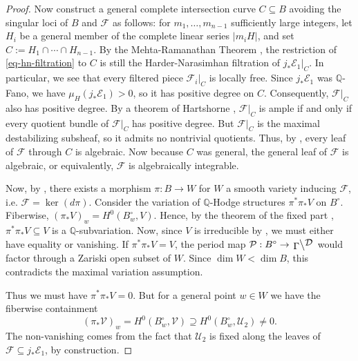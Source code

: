 \documentclass[12pt]{amsart}
\newcommand{\Q}{\mathbb{Q}}
\newcommand{\leftQ}[2]{\left.\raisebox{-.2em}{$#2$}\middle\backslash\raisebox{.2em}{$#1$}\right.}
\theoremstyle{definition}
\theoremstyle{remark}
\numberwithin{equation}{section}
\begin{document}
\begin{proof}
Now construct a general complete intersection curve \(C \subseteq B\) avoiding 
the singular loci of \(B\) and \(\mathcal{F}\) as follows: for 
\(m_1, \dots, m_{n-1}\) sufficiently large integers, let \(H_i\) be a general
member of the complete linear series \(|m_i H|\), and set 
\(C := H_1 \cap \cdots \cap H_{n-1}\). By the Mehta-Ramanathan Theorem 
\cite{mehta-ram84}, the restriction of \eqref{eq-hn-filtration} to \(C\)
is still the Harder-Narasimhan filtration of \(j_* \mathcal{E}_1|_C\).
In particular, we see that every filtered piece \(\mathcal{F}_i|_C\) is locally free.
Since \(j_* \mathcal{E}_1\) was \(\Q\)-Fano, we have \(\mu_H(j_* \mathcal{E}_1) > 0\),
so it has positive degree on \(C\). Consequently, \(\mathcal{F}|_C\) also has positive
degree. By a theorem of Hartshorne \cite[Theorem 2.4]{hart71}, \(\mathcal{F}|_C\)
is ample if and only if every quotient bundle of \(\mathcal{F}|_C\) has positive
degree. But \(\mathcal{F}|_C\) is the maximal destabilizing subsheaf, so it admits 
no nontrivial quotients. Thus, by , 
every leaf of \(\mathcal{F}\) through \(C\) is algebraic. Now because \(C\) was general,
the general leaf of \(\mathcal{F}\) is algebraic,
or equivalently, \(\mathcal{F}\) is algebraically integrable.

Now, by \cite[Theorem 2.1.9]{chen23}, there exists a morphism \(\pi: B \to W\)
for \(W\) a smooth variety inducing
\(\mathcal{F}\), i.e. \(\mathcal{F} = \ker(d\pi)\). Consider the 
variation of \(\Q\)-Hodge structures \(\pi^*\pi_* V\) on \(B^\circ\). Fiberwise, 
\((\pi_* V)_w = H^0(B_w^\circ, V)\). Hence, by the theorem of the fixed part
\cite{schmid73}, \(\pi^*\pi_* V \subseteq V\) is a \(\Q\)-subvariation. Now, since \(V\) is 
irreducible by , we must either have equality or vanishing.
If \(\pi^*\pi_* V = V\), the period map 
\(\mathcal{P}: B^\circ \to \leftQ{\mathcal{D}}{\Gamma}\) would factor through 
a Zariski open subset of \(W\). Since \(\dim W < \dim B\), this contradicts the 
maximal variation assumption.

Thus we must have \(\pi^* \pi_* V = 0\). But for a general point \(w \in W\) we have
the fiberwise containment
\begin{equation}
    (\pi_* \mathcal{V})_w = H^0(B_w^\circ, \mathcal{V}) \supseteq H^0(B_w^\circ, \mathcal{U}_2) \neq 0.
\end{equation}
The non-vanishing comes from the fact that \(\mathcal{U}_2\) is fixed along the leaves of 
\(\mathcal{F} \subseteq j_* \mathcal{E}_1\), by construction. 
\end{proof}
\end{document}
